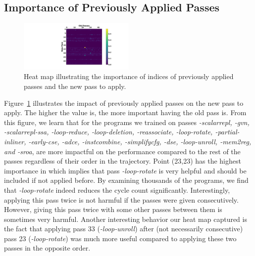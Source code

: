 \subsection{Importance of Previously Applied Passes}
\begin{figure}[!t]
    \centering
    \includegraphics[trim={15cm 3.5cm 4.6cm 0.8cm},clip,width=0.5\textwidth]{Figures/tree3.png}
    \caption{Heat map illustrating the importance of indices of previously applied passes and the new pass to apply.}
    \label{fig:heatmap2}
\end{figure}

Figure~\ref{fig:heatmap2} illustrates the impact of previously applied passes on the new pass to apply. The higher the value is, the more important having the old pass is. From this figure, we learn that for the programs we trained on passes \textit{-scalarrepl, -gvn, -scalarrepl-ssa, -loop-reduce, -loop-deletion, -reassociate, -loop-rotate, -partial-inliner, -early-cse, -adce, -instcombine, -simplifycfg, -dse, -loop-unroll, -mem2reg, and -sroa}, are more impactful on the performance compared to the rest of the passes regardless of their order in the trajectory. Point (23,23) has the highest importance in which implies that pass \textit{-loop-rotate} is very helpful and should be included if not applied before. By examining thousands of the programs, we find that \textit{-loop-rotate} indeed reduces the cycle count significantly. Interestingly, applying this pass twice is not harmful if the passes were given consecutively. However, giving this pass twice with some other passes between them is sometimes very harmful. Another interesting behavior our heat map captured is the fact that applying pass 33 (\textit{-loop-unroll}) after (not necessarily consecutive) pass 23 (\textit{-loop-rotate}) was much more useful compared to applying these two passes in the opposite order. 